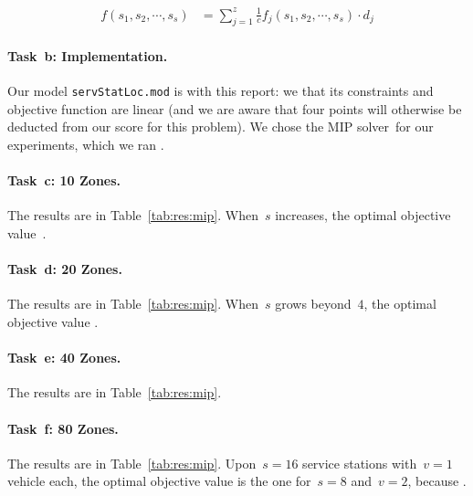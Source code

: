 \begin{align*}
	f(s_1, s_2, \cdots, s_s) & = \sum_{j=1}^{z} \frac{1}{c}f_j(s_1, s_2, \cdots, s_s) \cdot d_j
\end{align*}


\paragraph{Task~b: Implementation.}
Our model \texttt{servStatLoc.mod} is  with this
report: we  that its constraints and objective function
are linear (and we are aware that four points will otherwise be
deducted from our score for this problem).
%
We chose the MIP solver~\SolverMIP for our experiments, which we ran
.

\paragraph{Task~c: 10 Zones.}
The results are in Table~\ref{tab:res:mip}.
%
When~$s$ increases, the optimal objective value~\todo{\filler}.

\paragraph{Task~d: 20 Zones.}
The results are in Table~\ref{tab:res:mip}.
%
When~$s$ grows beyond~$4$, the optimal objective value \todo{\filler}.

\paragraph{Task~e: 40 Zones.}
The results are in Table~\ref{tab:res:mip}.

\paragraph{Task~f: 80 Zones.}
The results are in Table~\ref{tab:res:mip}.
%
Upon~$s=16$ service stations with~$v=1$ vehicle each, the optimal
objective value is \todo{\filler} the one for~$s=8$ and~$v=2$, because
\todo{\filler}.

